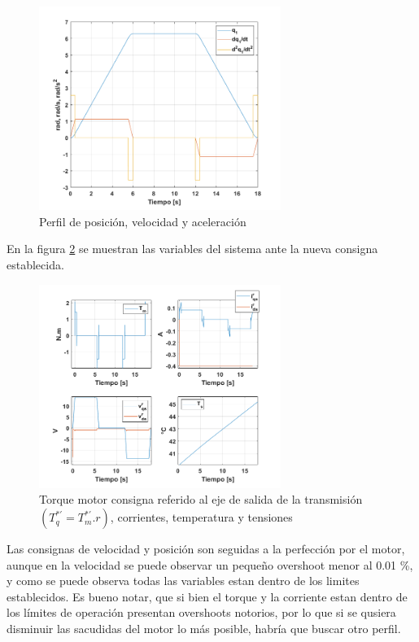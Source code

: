 \documentclass[10pt]{article}
\begin{document}
\begin{itemize}
 \begin{figure}[h!]
	\centering
	\includegraphics[width=0.7\textwidth]{consignasnuevas.png}
	\caption{\label{fig:consignasnuevas}Perfil de posición, velocidad y aceleración}
	\end{figure}

	En la figura \ref{fig:consignanuevapara} se muestran las variables del sistema ante la nueva consigna establecida.

	\begin{figure}[h!]
		\centering
		\includegraphics[width=0.7\textwidth]{consignanuevapara.png}
		\caption{\label{fig:consignanuevapara}Torque motor consigna referido al eje de salida de la transmisión $(T^{*'}_{q}=T^{*'}_{m}.r)$, corrientes, temperatura y tensiones}
		\end{figure}

	Las consignas de velocidad y posición son seguidas a la perfección por el motor, aunque en la velocidad se puede observar un pequeño overshoot menor al 0.01 \%, y como se puede observa todas las variables estan dentro de los limites establecidos. Es bueno notar,
	 que si bien el torque y la corriente estan dentro de los límites de operación presentan overshoots notorios, por lo que si se qusiera disminuir las sacudidas del motor lo más posible, habría que buscar otro perfil.
	 

\end{itemize}
\end{document}
